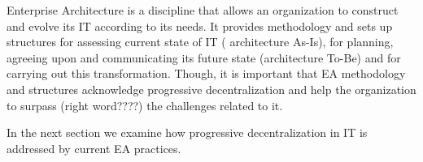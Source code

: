 
Enterprise Architecture is a discipline  that allows an organization to construct and evolve its IT according to its needs. It provides  methodology and sets up structures  for assessing current state of IT ( architecture As-Is), for planning, agreeing upon and communicating its future state (architecture To-Be) and for carrying out this transformation. Though, it is important that  EA methodology and structures acknowledge progressive decentralization and help the organization to surpass (right word????) the challenges related to it.

In the next section we examine how progressive decentralization in IT is addressed by current EA practices. 

